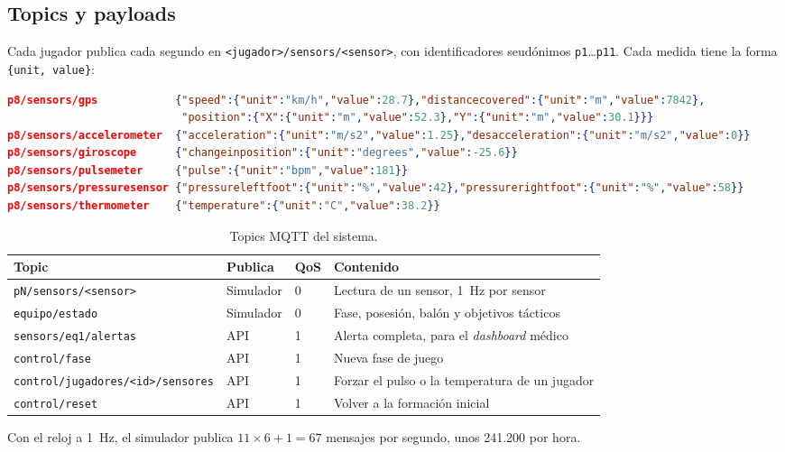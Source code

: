 \documentclass[runningheads]{llncs}
\newcommand{\topic}[1]{\texttt{#1}}
\begin{document}
\subsection{Topics y payloads}

Cada jugador publica cada segundo en \topic{<jugador>/sensors/<sensor>}, con identificadores seudónimos \texttt{p1}\ldots\texttt{p11}. Cada medida tiene la forma \texttt{\{unit, value\}}:

\begin{lstlisting}[language=json]
p8/sensors/gps            {"speed":{"unit":"km/h","value":28.7},"distancecovered":{"unit":"m","value":7842},
                           "position":{"X":{"unit":"m","value":52.3},"Y":{"unit":"m","value":30.1}}}
p8/sensors/accelerometer  {"acceleration":{"unit":"m/s2","value":1.25},"desacceleration":{"unit":"m/s2","value":0}}
p8/sensors/giroscope      {"changeinposition":{"unit":"degrees","value":-25.6}}
p8/sensors/pulsemeter     {"pulse":{"unit":"bpm","value":181}}
p8/sensors/pressuresensor {"pressureleftfoot":{"unit":"%","value":42},"pressurerightfoot":{"unit":"%","value":58}}
p8/sensors/thermometer    {"temperature":{"unit":"C","value":38.2}}
\end{lstlisting}

\begin{table}[!htbp]
\centering
\caption{Topics MQTT del sistema.}\label{tab:topics}
\footnotesize
\begin{tabularx}{\textwidth}{p{4.2cm}p{1.9cm}p{0.8cm}L}
\toprule
\textbf{Topic} & \textbf{Publica} & \textbf{QoS} & \textbf{Contenido} \\
\midrule
\topic{pN/sensors/<sensor>} & Simulador & 0 & Lectura de un sensor, 1~Hz por sensor \\
\topic{equipo/estado} & Simulador & 0 & Fase, posesión, balón y objetivos tácticos \\
\topic{sensors/eq1/alertas} & API & 1 & Alerta completa, para el \emph{dashboard} médico \\
\topic{control/fase} & API & 1 & Nueva fase de juego \\
\topic{control/jugadores/<id>/sensores} & API & 1 & Forzar el pulso o la temperatura de un jugador \\
\topic{control/reset} & API & 1 & Volver a la formación inicial \\
\bottomrule
\end{tabularx}
\end{table}

Con el reloj a 1~Hz, el simulador publica $11\times6+1=67$ mensajes por segundo, unos 241.200 por hora.
\end{document}
